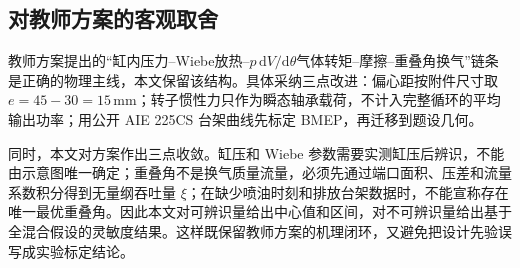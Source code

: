 \subsection{对教师方案的客观取舍}

教师方案提出的“缸内压力--Wiebe放热--$p\,\mathrm dV/\mathrm d\theta$气体转矩--摩擦--重叠角换气”链条是正确的物理主线，本文保留该结构。具体采纳三点改进：偏心距按附件尺寸取 $e=45-30=15\,\mathrm{mm}$；转子惯性力只作为瞬态轴承载荷，不计入完整循环的平均输出功率；用公开 AIE 225CS 台架曲线先标定 BMEP，再迁移到题设几何。

同时，本文对方案作出三点收敛。缸压和 Wiebe 参数需要实测缸压后辨识，不能由示意图唯一确定；重叠角不是换气质量流量，必须先通过端口面积、压差和流量系数积分得到无量纲吞吐量 $\xi$；在缺少喷油时刻和排放台架数据时，不能宣称存在唯一最优重叠角。因此本文对可辨识量给出中心值和区间，对不可辨识量给出基于全混合假设的灵敏度结果。这样既保留教师方案的机理闭环，又避免把设计先验误写成实验标定结论。

